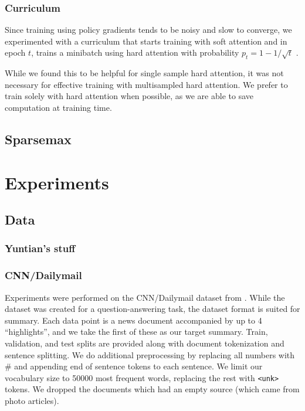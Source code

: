 \documentclass[11pt]{report}
\begin{document}
\subsection{Curriculum}

Since training using policy gradients tends to be noisy and slow to converge, we experimented with a curriculum that starts training with soft attention and in epoch $t$, trains a minibatch using hard attention with probability $p_t = 1 - 1/\sqrt{t}$ \citep{bengio2016hardntm}.

While we found this to be helpful for single sample hard attention, it was not necessary for effective training with multisampled hard attention. We prefer to train solely with hard attention when possible, as we are able to save computation at training time.

\section{Sparsemax}



\chapter{Experiments}

\section{Data}

\subsection{Yuntian's stuff}


\subsection{CNN/Dailymail}

Experiments were performed on the CNN/Dailymail dataset from \cite{hermann2015read}. While the dataset was created for a question-answering task, the dataset format is suited for summary. Each data point is a news document accompanied by up to 4 ``highlights'', and we take the first of these as our target summary. Train, validation, and test splits are provided along with document tokenization and sentence splitting. We do additional preprocessing by replacing all numbers with \# and appending end of sentence tokens to each sentence. We limit our vocabulary size to 50000 most frequent words, replacing the rest with \texttt{<unk>} tokens. We dropped the documents which had an empty source (which came from photo articles).
\end{document}
